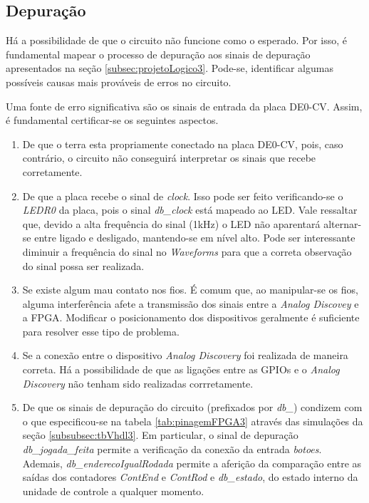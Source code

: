 \documentclass[amsmath,amssymb,floatfix]{report}
\begin{document}
\subsection{Depuração}
\label{subsec:depuracao3}

Há a possibilidade de que o circuito não funcione como o esperado. Por isso, é fundamental mapear o processo de depuração aos sinais de depuração apresentados na seção \ref{subsec:projetoLogico3}. Pode-se, identificar algumas possíveis causas mais prováveis de erros no circuito. 

Uma fonte de erro significativa são os sinais de entrada da placa DE0-CV. Assim, é fundamental certificar-se os seguintes aspectos.

\begin{enumerate}
    \item De que o terra esta propriamente conectado na placa DE0-CV, pois, caso contrário, o circuito não conseguirá interpretar os sinais que recebe corretamente.
   \item De que a placa recebe o sinal de \textit{clock}. Isso pode ser feito verificando-se o \textit{LEDR0} da placa, pois o sinal \textit{db\_clock} está mapeado ao LED. Vale ressaltar que, devido a alta frequência do sinal (1kHz) o LED não aparentará alternar-se entre ligado e desligado, mantendo-se em nível alto. Pode ser interessante diminuir a frequência do sinal no \textit{Waveforms} para que a correta observação do sinal possa ser realizada.
   \item Se existe algum mau contato nos fios. É comum que, ao manipular-se os fios, alguma interferência afete a transmissão dos sinais entre a \textit{Analog Discovey} e a FPGA. Modificar o posicionamento dos dispositivos geralmente é suficiente para resolver esse tipo de problema. 
   \item Se a conexão entre o dispositivo \textit{Analog Discovery} foi realizada de maneira correta. Há a possibilidade de que as ligações entre as GPIOs e o \textit{Analog Discovery} não tenham sido realizadas corrretamente.
   \item De que os sinais de depuração do circuito (prefixados por \textit{db\_}) condizem com o que especificou-se na tabela \ref{tab:pinagemFPGA3} através das simulações da seção \ref{subsubsec:tbVhdl3}. Em particular, o sinal de depuração \textit{db\_jogada\_feita} permite a verificação da conexão da entrada \textit{botoes}. Ademais, \textit{db\_enderecoIgualRodada} permite a aferição da comparação entre as saídas dos contadores \textit{ContEnd} e \textit{ContRod} e \textit{db\_estado}, do estado interno da unidade de controle a qualquer momento.
\end{enumerate}
\end{document}
